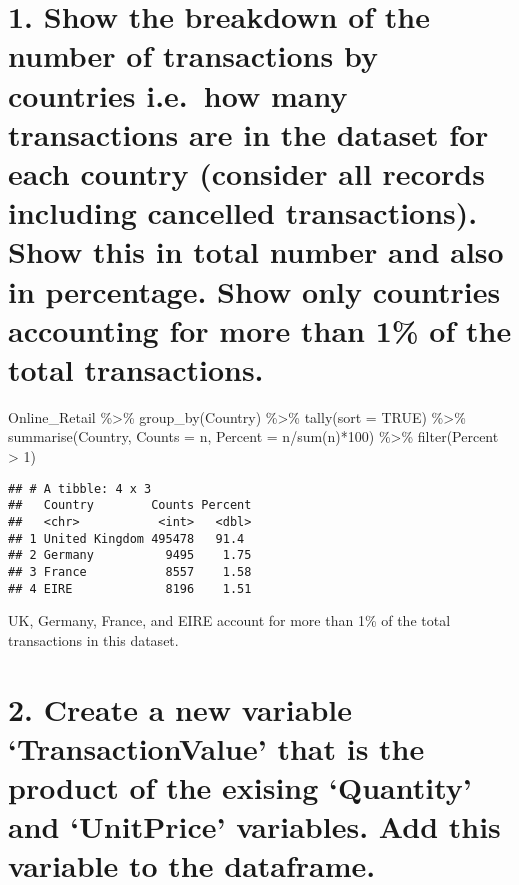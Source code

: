 \documentclass[
]{article}
\newenvironment{Shaded}{\begin{snugshade}}{\end{snugshade}}
\newcommand{\AttributeTok}[1]{\textcolor[rgb]{0.77,0.63,0.00}{#1}}
\newcommand{\ConstantTok}[1]{\textcolor[rgb]{0.00,0.00,0.00}{#1}}
\newcommand{\DecValTok}[1]{\textcolor[rgb]{0.00,0.00,0.81}{#1}}
\newcommand{\FunctionTok}[1]{\textcolor[rgb]{0.00,0.00,0.00}{#1}}
\newcommand{\NormalTok}[1]{#1}
\newcommand{\SpecialCharTok}[1]{\textcolor[rgb]{0.00,0.00,0.00}{#1}}
\begin{document}
\hypertarget{show-the-breakdown-of-the-number-of-transactions-by-countries-i.e.-how-many-transactions-are-in-the-dataset-for-each-country-consider-all-records-including-cancelled-transactions.-show-this-in-total-number-and-also-in-percentage.-show-only-countries-accounting-for-more-than-1-of-the-total-transactions.}{%
\section{1. Show the breakdown of the number of transactions by
countries i.e.~how many transactions are in the dataset for each country
(consider all records including cancelled transactions). Show this in
total number and also in percentage. Show only countries accounting for
more than 1\% of the total
transactions.}\label{show-the-breakdown-of-the-number-of-transactions-by-countries-i.e.-how-many-transactions-are-in-the-dataset-for-each-country-consider-all-records-including-cancelled-transactions.-show-this-in-total-number-and-also-in-percentage.-show-only-countries-accounting-for-more-than-1-of-the-total-transactions.}}

\begin{Shaded}
\begin{Highlighting}[]
\NormalTok{Online\_Retail }\SpecialCharTok{\%\textgreater{}\%}
\FunctionTok{group\_by}\NormalTok{(Country)  }\SpecialCharTok{\%\textgreater{}\%}
  \FunctionTok{tally}\NormalTok{(}\AttributeTok{sort =} \ConstantTok{TRUE}\NormalTok{) }\SpecialCharTok{\%\textgreater{}\%} \FunctionTok{summarise}\NormalTok{(Country, }\AttributeTok{Counts =}\NormalTok{ n, }\AttributeTok{Percent =}\NormalTok{ n}\SpecialCharTok{/}\FunctionTok{sum}\NormalTok{(n)}\SpecialCharTok{*}\DecValTok{100}\NormalTok{) }\SpecialCharTok{\%\textgreater{}\%} \FunctionTok{filter}\NormalTok{(Percent }\SpecialCharTok{\textgreater{}} \DecValTok{1}\NormalTok{)}
\end{Highlighting}
\end{Shaded}

\begin{verbatim}
## # A tibble: 4 x 3
##   Country        Counts Percent
##   <chr>           <int>   <dbl>
## 1 United Kingdom 495478   91.4 
## 2 Germany          9495    1.75
## 3 France           8557    1.58
## 4 EIRE             8196    1.51
\end{verbatim}

UK, Germany, France, and EIRE account for more than 1\% of the total
transactions in this dataset.

\hypertarget{create-a-new-variable-transactionvalue-that-is-the-product-of-the-exising-quantity-and-unitprice-variables.-add-this-variable-to-the-dataframe.}{%
\section{2. Create a new variable `TransactionValue' that is the product
of the exising `Quantity' and `UnitPrice' variables. Add this variable
to the
dataframe.}\label{create-a-new-variable-transactionvalue-that-is-the-product-of-the-exising-quantity-and-unitprice-variables.-add-this-variable-to-the-dataframe.}}
\end{document}
